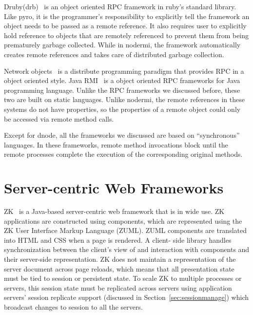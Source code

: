 Druby(drb)~\cite{druby} is an object oriented RPC framework in ruby's standard
library. Like pyro, it is the programmer's responsibility to explicitly tell
the framework an object needs to be passed as a remote reference. It also
requires user to explicitly hold reference  to objects that are remotely
referenced  to prevent them from being prematurely garbage collected. While in
nodermi, the framework automatically creates remote references and takes care
of distributed garbage collection.



Network objects~\cite{birrell1993distributed} is a distribute programming
paradigm that provides RPC in a object oriented style. Java RMI~\cite{j2eedoc}
is a object oriented RPC frameworks for Java programming language. Unlike the
RPC frameworks we discussed before, these two are built on static languages.
Unlike nodermi, the remote references in these systems do not have properties,
so the properties of a remote object could only be accessed via remote method
calls.


Except for dnode, all the frameworks we discussed  are based on
``synchronous'' languages. In these frameworks, remote method invocations
block until  the remote processes complete the execution of the  corresponding
original methods.




\section{Server-centric Web Frameworks}

ZK~\cite{ChenCheng:book2007} is a Java-based server-centric web framework that
is in wide use. ZK applications are constructed using components, which are
represented using the ZK User Interface Markup Language (ZUML).  ZUML
components are translated into HTML and CSS when a page is rendered. A client-
side library handles synchronization between the client's  view of and
interaction with components and their server-side  representation.  ZK does
not maintain a representation of the server document across page reloads,
which means that all presentation state must be tied to session or persistent
state. To scale ZK to multiple processes or servers, this session state must
be replicated across servers using application servers' session replicate
support  (discussed in Section~\ref{sec:sessionmanage}) which broadcast
changes to session to all the servers.

